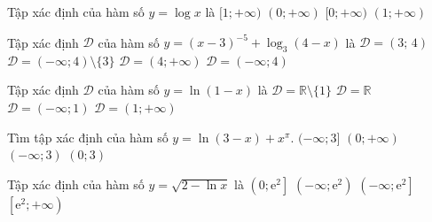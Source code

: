 \begin{ex}%
	Tập  xác định của hàm số $y=\log x$ là
	 \choice
		 {$[1;+\infty)$}
		{\True  $(0;+\infty)$}
		{$[0;+\infty)$} 
		 {$(1;+\infty)$}
\end{ex}

\begin{ex}%
	Tập xác định $ \mathscr{D}$ của hàm số $y=(x-3)^{-5}+\log_3(4-x)$ là 
	\choice 
		{$\mathscr{D}=(3;\,4)$} 
		{\True  $\mathscr{D}=(-\infty;4)\setminus\{3\}$}
		 {$\mathscr{D}=(4;+\infty)$}
		{$\mathscr{D}=(-\infty;4)$} 
\end{ex}

\begin{ex}%
	Tập xác định $\mathscr{D}$ của hàm  số $y=\ln(1-x)$ là
	 \choice
		{$\mathscr{D}=\mathbb{R}\setminus\{1\}$} 
		{$\mathscr{D}=\mathbb{R}$} 
		{\True $\mathscr{D}=(-\infty;1)$} 
		{$\mathscr{D}=(1;+\infty)$} 
\end{ex}

\begin{ex}%
	Tìm tập xác định của hàm số $y=\ln(3-x)+x^\pi$. 
	\choice 
		 {$(-\infty;3]$}
		 {$(0;+\infty)$}
		 {$(-\infty;3)$}
		{\True $(0;3)$} 
\end{ex}

\begin{ex}%
	Tập xác định của hàm số $ y=\sqrt{2-\ln x}$ là 
	\choice 
		{\True  $\left(0;\mathrm{e^2}\right]$}
		 {$\left(-\infty;\mathrm{e^2}\right)$}
		 {$\left(-\infty;\mathrm{e^2}\right]$}
		 {$\left[\mathrm{e^2};+\infty\right)$}
	 \loigiai{
		Hàm số xác định  $\Leftrightarrow\heva{&
		2-\ln  x\ge 0\\&
		 x>0} \Leftrightarrow\heva{&
		\ln  x\le 2\\&
		 x>0} \Leftrightarrow\heva{&
		x\le \mathrm{e^2}\\& 
		x>0.}$\\ 
		Vậy  tập xác định $ \mathscr{D}=\left(0;\mathrm{e^2}\right]$.
	 }
\end{ex}

